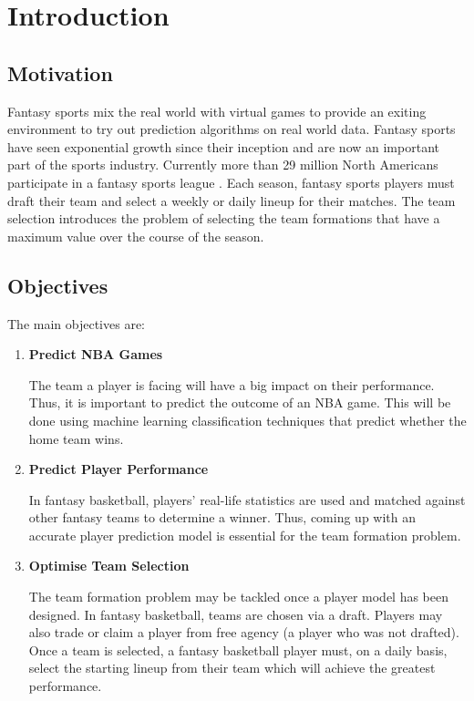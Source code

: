 \chapter{Introduction}

\section{Motivation}
Fantasy sports mix the real world with virtual games to provide an exiting environment to try out prediction algorithms on real world data.  Fantasy sports have seen exponential growth since their inception and are now an important part of the sports industry.  Currently more than 29 million North Americans participate in a fantasy sports league \cite{fantasy_football_effects}.  Each season, fantasy sports players must draft their team and select a weekly or daily lineup for their matches.  The team selection introduces the problem of selecting the team formations that have a maximum value over the course of the season.

\section{Objectives}
The main objectives are:

\begin{enumerate}
	
	\item \textbf{Predict NBA Games}
	
	The team a player is facing will have a big impact on their performance.  Thus, it is important to predict the outcome of an NBA game.  This will be done using machine learning classification techniques that predict whether the home team wins.  
	
	\item \textbf{Predict Player Performance}
	
	In fantasy basketball, players' real-life statistics are used and matched against other fantasy teams to determine a winner.  Thus, coming up with an accurate player prediction model is essential for the team formation problem.
	
	\item \textbf{Optimise Team Selection}
	
	The team formation problem may be tackled once a player model has been designed.  In fantasy basketball, teams are chosen via a draft.  Players may also trade or claim a player from free agency (a player who was not drafted).  Once a team is selected, a fantasy basketball player must, on a daily basis, select the starting lineup from their team which will achieve the greatest performance.
	
\end{enumerate}

